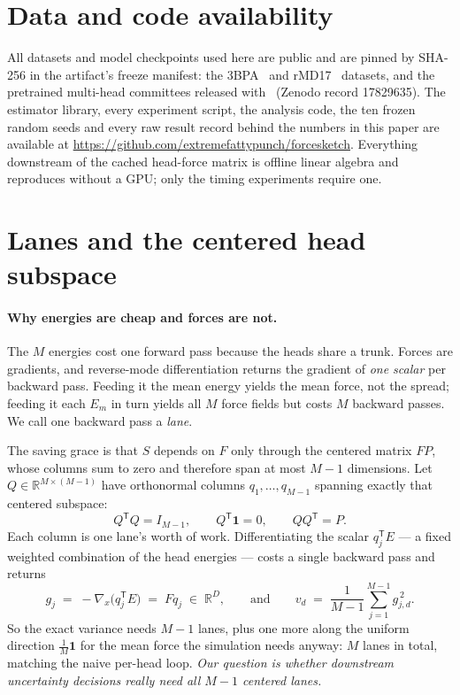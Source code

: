 \documentclass{article}
\newcommand{\fsCodeUrl}{https://github.com/extremefattypunch/forcesketch}
\begin{document}
\section{Data and code availability}
\label{app:avail}
All datasets and model checkpoints used here are public and are pinned by SHA-256 in the artifact's
freeze manifest: the 3BPA~\citep{botnet3bpa} and rMD17~\citep{rmd17} datasets, and the pretrained
multi-head committees released with~\citet{beck2025mhc} (Zenodo record 17829635). The estimator
library, every experiment script, the analysis code, the ten frozen random seeds and every raw
result record behind the numbers in this paper are available at
\url{\fsCodeUrl}. Everything downstream of the cached head-force matrix is offline linear algebra
and reproduces without a GPU; only the timing experiments require one.


\section{Lanes and the centered head subspace}
\label{app:lanes}
\paragraph{Why energies are cheap and forces are not.}
The $M$ energies cost one forward pass because the heads share a trunk. Forces are gradients, and
reverse-mode differentiation returns the gradient of \emph{one scalar} per backward pass. Feeding it
the mean energy yields the mean force, not the spread; feeding it each $E_m$ in turn yields all $M$
force fields but costs $M$ backward passes. We call one backward pass a \emph{lane}.

The saving grace is that $S$ depends on $F$ only through the centered matrix $FP$, whose columns sum
to zero and therefore span at most $M-1$ dimensions. Let $Q\in\mathbb{R}^{M\times(M-1)}$ have
orthonormal columns $q_1,\dots,q_{M-1}$ spanning exactly that centered subspace:
\begin{equation*}
Q^{\mathsf T}Q=I_{M-1},\qquad Q^{\mathsf T}\mathbf 1=0,\qquad QQ^{\mathsf T}=P .
\end{equation*}
Each column is one lane's worth of work. Differentiating the scalar $q_j^{\mathsf T}E$ --- a fixed
weighted combination of the head energies --- costs a single backward pass and returns
\begin{equation}
g_j\;=\;-\nabla_x\bigl(q_j^{\mathsf T}E\bigr)\;=\;Fq_j\;\in\;\mathbb{R}^{D},
\qquad\text{and}\qquad
v_d\;=\;\frac{1}{M-1}\sum_{j=1}^{M-1} g_{j,d}^{\,2} .
\end{equation}
So the exact variance needs $M-1$ lanes, plus one more along the uniform direction
$\tfrac1M\mathbf 1$ for the mean force the simulation needs anyway: $M$ lanes in total, matching the
naive per-head loop. \emph{Our question is whether downstream uncertainty decisions really need all
$M-1$ centered lanes.}
\end{document}
